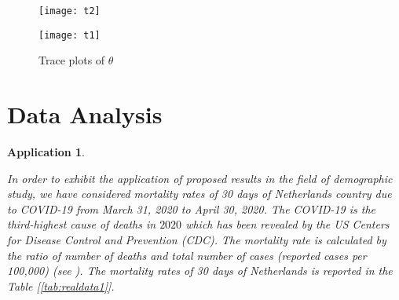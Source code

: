 \documentclass[11pt,a4paper]{article}
\numberwithin{equation}{section}
\newtheorem{application}{Application}[section]
\begin{document}
	\begin{figure}[h]

		\centering

		\begin{minipage}{.5\textwidth}

			\centering

			\texttt{[image: t2]}


			\label{fig:t2}

		\end{minipage}%

		\begin{minipage}{.5\textwidth}

			\centering

			\texttt{[image: t1]}


			\label{fig:t1}

		\end{minipage}

		\caption{Trace plots of $\theta$}

		\label{plots}

	\end{figure}

	

	\section{Data Analysis}\label{sec:real}

	\begin{application} \label{appli1}

		In order to exhibit the application of proposed results in the field of demographic study, we have considered mortality rates of 30 days of Netherlands country due to COVID-19 from March 31, 2020 to April 30, 2020. The COVID-19 is the third-highest cause of deaths in $2020$ which has been revealed by the US Centers for Disease Control and Prevention (CDC). The mortality rate is calculated by the ratio of number of deaths and total number of cases (reported cases per 100,000) (see \cite{albalawi2022estimation}). The mortality rates of 30 days of Netherlands is reported in the Table [\ref{tab:realdata1}].

	\end{application}
\end{document}
